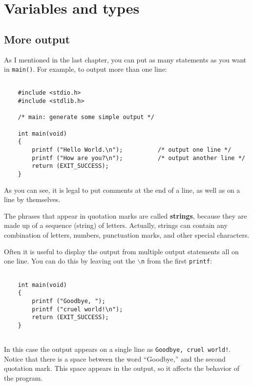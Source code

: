 
\setcounter{chapter}{1}
\chapter{Variables and types}

\section{More output}

As I mentioned in the last chapter, you can put as many statements as
you want in {\tt main()}.  For example, to output more than one line:

\begin{verbatim}

    #include <stdio.h>
    #include <stdlib.h>
  
    /* main: generate some simple output */
  
    int main(void)
    {
        printf ("Hello World.\n");		    /* output one line */
        printf ("How are you?\n");		    /* output another line */       
        return (EXIT_SUCCESS);
    }

\end{verbatim}
%
As you can see, it is legal to put comments at the
end of a line, as well as on a line by themselves.


The phrases that appear in quotation marks are called {\bf strings},
because they are made up of a sequence (string) of letters.  Actually,
strings can contain any combination of letters, numbers, punctuation
marks, and other special characters.


Often it is useful to display the output from multiple output
statements all on one line.  You can do this by leaving out
the {\tt $\backslash$n} from the first {\tt printf}:

\begin{verbatim}

    int main(void)
    {
        printf ("Goodbye, ");
        printf ("cruel world!\n");	     
        return (EXIT_SUCCESS);
    }
    
\end{verbatim}
%
In this case the output appears on a single line as
{\tt Goodbye, cruel world!}.  Notice that there is a space
between the word ``Goodbye,'' and the second quotation mark.
This space appears in the output, so it affects the behavior
of the program.

